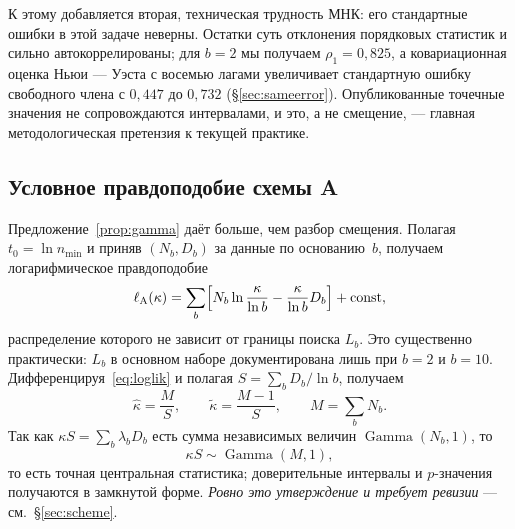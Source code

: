 \documentclass[11pt,a4paper]{article}
\theoremstyle{plain}
\theoremstyle{remark}
\DeclareMathOperator{\Gam}{Gamma}
\begin{document}
К этому добавляется вторая, техническая трудность МНК: его стандартные ошибки в этой задаче
неверны. Остатки суть отклонения порядковых статистик и сильно автокоррелированы;
для $b=2$ мы получаем $\rho_1=0{,}825$, а ковариационная оценка Ньюи --- Уэста с восемью
лагами увеличивает стандартную ошибку свободного члена с $0{,}447$ до $0{,}732$
(\S\ref{sec:sameerror}). Опубликованные точечные значения не сопровождаются интервалами,
и это, а не смещение, --- главная методологическая претензия к текущей практике.

\subsection{Условное правдоподобие схемы A}\label{sec:condlik}

Предложение~\ref{prop:gamma} даёт больше, чем разбор смещения. Полагая $t_0=\ln n_{\min}$
и приняв $(N_b,D_b)$ за данные по основанию~$b$, получаем логарифмическое правдоподобие
\begin{equation}\label{eq:loglik}
\ell_{\mathrm A}(\kappa)=\sum_b\Bigl[N_b\ln\frac{\kappa}{\ln b}-\frac{\kappa}{\ln b}D_b\Bigr]+\mathrm{const},
\end{equation}
распределение которого не зависит от границы поиска $L_b$. Это существенно практически:
$L_b$ в основном наборе документирована лишь при $b=2$ и $b=10$. Дифференцируя~\eqref{eq:loglik} и полагая
$S=\sum_b D_b/\ln b$, получаем
\begin{equation}\label{eq:mle}
\hat\kappa=\frac{M}{S},\qquad \tilde\kappa=\frac{M-1}{S},\qquad M=\sum_b N_b .
\end{equation}
Так как $\kappa S=\sum_b\lambda_bD_b$ есть сумма независимых величин $\Gam(N_b,1)$, то
\begin{equation}\label{eq:pivot}
\kappa S\sim\Gam(M,1),
\end{equation}
то есть точная центральная статистика; доверительные интервалы и $p$-значения получаются
в замкнутой форме. \emph{Ровно это утверждение и требует ревизии} --- см.~\S\ref{sec:scheme}.
\end{document}
